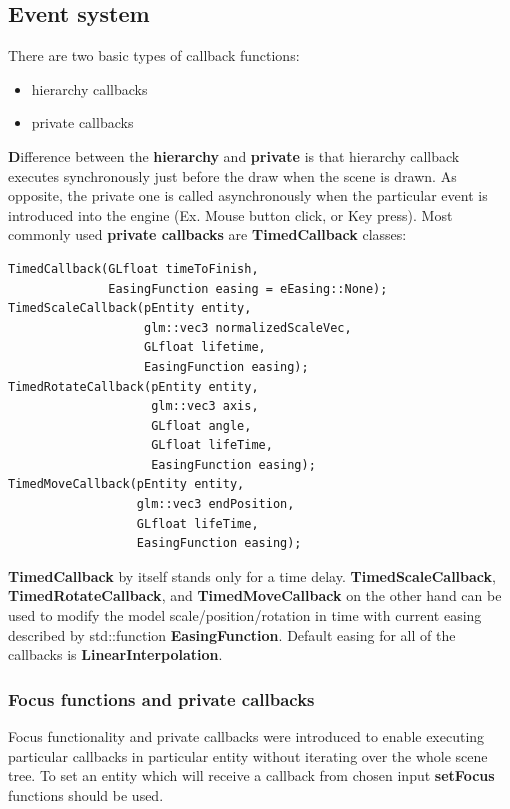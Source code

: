 \documentclass{article}
\begin{document}
\newpage
\subsection{Event system}\label{sec:Event system}
\indent \indent There are two basic types of callback functions:
\begin{itemize}
\item hierarchy callbacks
\item private callbacks
\end{itemize}

\indent \indent \textbf Difference between the \textbf{hierarchy} and \textbf{private} is that hierarchy callback executes synchronously just before the draw when the scene is drawn. As opposite, the private one is called asynchronously when the particular event is introduced into the engine (Ex. Mouse button click, or Key press). Most commonly used \textbf{private callbacks} are \textbf{TimedCallback} classes:

\begin{lstlisting}
TimedCallback(GLfloat timeToFinish,
              EasingFunction easing = eEasing::None);
TimedScaleCallback(pEntity entity,
                   glm::vec3 normalizedScaleVec,
                   GLfloat lifetime,
                   EasingFunction easing);
TimedRotateCallback(pEntity entity,
                    glm::vec3 axis,
                    GLfloat angle,
                    GLfloat lifeTime,
                    EasingFunction easing);
TimedMoveCallback(pEntity entity,
                  glm::vec3 endPosition,
                  GLfloat lifeTime,
                  EasingFunction easing);
\end{lstlisting}

\indent \indent \textbf{TimedCallback} by itself stands only for a time delay. \textbf{TimedScaleCallback}, \textbf{TimedRotateCallback}, and \textbf{TimedMoveCallback} on the other hand can be used to modify the model scale/position/rotation in time with current easing described by std::function \textbf{EasingFunction}. Default easing for all of the callbacks is \textbf{LinearInterpolation}.
\newpage

\subsubsection{Focus functions and private callbacks}\label{sec:Focus functions and private callbacks}
\indent \indent Focus functionality and private callbacks were introduced to enable executing particular callbacks in particular entity without iterating over the whole scene tree. To set an entity which will receive a callback from chosen input \textbf{setFocus} functions should be used.
\newline
\end{document}
